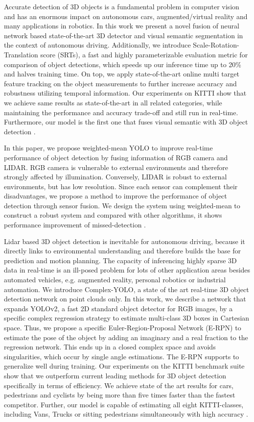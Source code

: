 Accurate detection of 3D objects is a fundamental problem in computer vision and has an enormous impact on autonomous cars, augmented/virtual reality and many applications in robotics. In this work we present a novel fusion of neural network based state-of-the-art 3D detector and visual semantic segmentation in the context of autonomous driving. Additionally, we introduce Scale-Rotation-Translation score (SRTs), a fast and highly parameterizable evaluation metric for comparison of object detections, which speeds up our inference time up to 20\% and halves training time. On top, we apply state-of-the-art online multi target feature tracking on the object measurements to further increase accuracy and robustness utilizing temporal information. Our experiments on KITTI show that we achieve same results as state-of-the-art in all related categories, while maintaining the performance and accuracy trade-off and still run in real-time. Furthermore, our model is the first one that fuses visual semantic with 3D object detection \cite{Simon2019a}.

In this paper, we propose weighted-mean YOLO to improve real-time performance of object detection by fusing information of RGB camera and LIDAR. RGB camera is vulnerable to external environments and therefore strongly affected by illumination. Conversely, LIDAR is robust to external environments, but has low resolution. Since each sensor can complement their disadvantages, we propose a method to improve the performance of object detection through sensor fusion. We design the system using weighted-mean to construct a robust system and compared with other algorithms, it shows performance improvement of missed-detection \cite{Kim2019}.

Lidar based 3D object detection is inevitable for autonomous driving, because it directly links to environmental understanding and therefore builds the base for prediction and motion planning. The capacity of inferencing highly sparse 3D data in real-time is an ill-posed problem for lots of other application areas besides automated vehicles, e.g. augmented reality, personal robotics or industrial automation. We introduce Complex-YOLO, a state of the art real-time 3D object detection network on point clouds only. In this work, we describe a network that expands YOLOv2, a fast 2D standard object detector for RGB images, by a specific complex regression strategy to estimate multi-class 3D boxes in Cartesian space. Thus, we propose a specific Euler-Region-Proposal Network (E-RPN) to estimate the pose of the object by adding an imaginary and a real fraction to the regression network. This ends up in a closed complex space and avoids singularities, which occur by single angle estimations. The E-RPN supports to generalize well during training. Our experiments on the KITTI benchmark suite show that we outperform current leading methods for 3D object detection specifically in terms of efficiency. We achieve state of the art results for cars, pedestrians and cyclists by being more than five times faster than the fastest competitor. Further, our model is capable of estimating all eight KITTI-classes, including Vans, Trucks or sitting pedestrians simultaneously with high accuracy \cite{Simon2019}.

